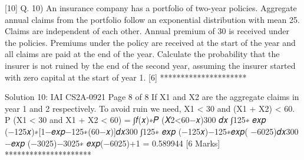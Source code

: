 [10]
Q. 10) An insurance company has a portfolio of two-year policies. Aggregate annual claims from
the portfolio follow an exponential distribution with mean 25. Claims are independent of
each other. Annual premium of 30 is received under the policies. Premiums under the
policy are received at the start of the year and all claims are paid at the end of the year.
Calculate the probability that the insurer is not ruined by the end of the second year,
assuming the insurer started with zero capital at the start of year 1. [6]
*********************


Solution 10:
IAI CS2A-0921
Page 8 of 8
If X1 and X2 are the aggregate claims in year 1 and 2 respectively.
To avoid ruin we need, X1 < 30 and (X1 + X2) < 60.
P (X1 < 30 and X1 + X2 < 60) = ∫𝑓(𝑥)∗𝑃 (𝑋2<60−𝑥)300 𝑑𝑥
∫125∗ 𝑒𝑥𝑝 (−125𝑥)∗[1−𝑒𝑥𝑝{−125∗(60−𝑥)}]𝑑𝑥300
∫125∗ 𝑒𝑥𝑝 (−125𝑥)−125∗𝑒𝑥𝑝( −6025)𝑑𝑥300
−𝑒𝑥𝑝 (−3025)−3025∗ 𝑒𝑥𝑝(−6025)+1
= 0.589944
[6 Marks]
*********************